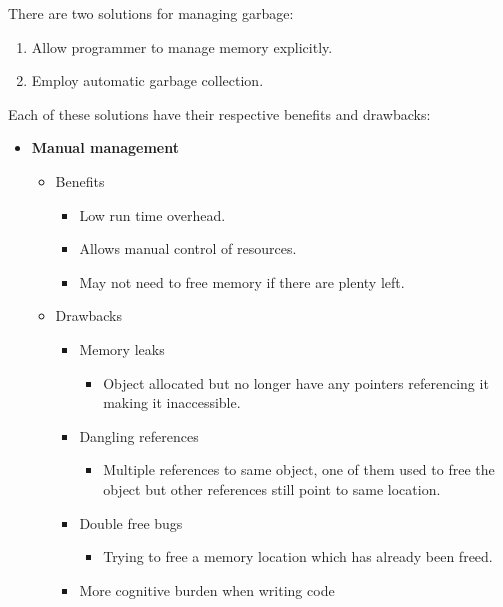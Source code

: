 \begin{definition}
    There are two solutions for managing garbage:
    \begin{enumerate}
        \item Allow programmer to manage memory explicitly.
        \item Employ automatic garbage collection.
    \end{enumerate}
    
    Each of these solutions have their respective benefits and drawbacks:
    \begin{itemize}
        \item \textbf{Manual management}
        \begin{itemize}
            \item Benefits
            \begin{itemize}
                \item Low run time overhead.
                \item Allows manual control of resources.
                \item May not need to free memory if there are plenty left.
            \end{itemize}
            \item Drawbacks
            \begin{itemize}
                \item Memory leaks
                \begin{itemize}
                    \item Object allocated but no longer have any pointers referencing it making it inaccessible.
                \end{itemize}
                \item Dangling references
                \begin{itemize}
                    \item Multiple references to same object, one of them used to free the object but other references still point to same location.
                \end{itemize}
                \item Double free bugs
                \begin{itemize}
                    \item Trying to free a memory location which has already been freed.
                \end{itemize}
                \item More cognitive burden when writing code

\end{itemize}
\end{itemize}
\end{itemize}
\end{definition}
